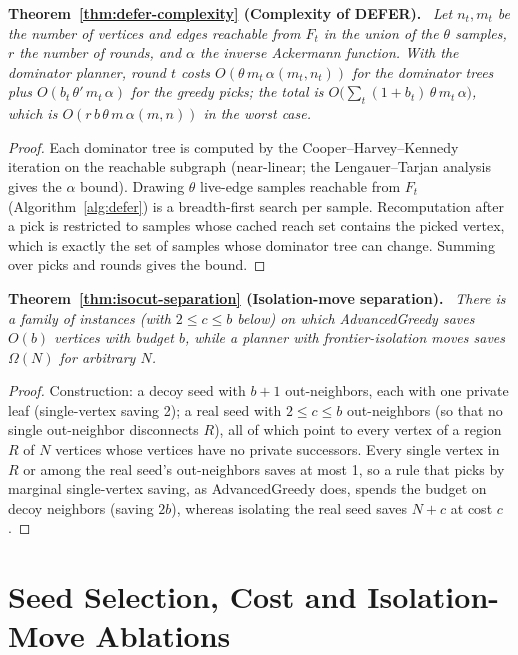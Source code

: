 \documentclass[preprint,11pt]{elsarticle}
\theoremstyle{definition}
\theoremstyle{remark}
\newenvironment{repeattheorem}[1][]{\par\medskip\noindent\textbf{#1.}\ \itshape}{\par\medskip}
\begin{document}
\begin{repeattheorem}[Theorem~\ref{thm:defer-complexity} (Complexity of DEFER)]
Let $n_t,m_t$ be the number of vertices and edges reachable from $F_t$ in
the union of the $\theta$ samples, $r$ the number of rounds, and $\alpha$
the inverse Ackermann function. With the dominator planner, round $t$
costs $O(\theta\,m_t\,\alpha(m_t,n_t))$ for the dominator trees plus
$O(b_t\,\theta'\,m_t\,\alpha)$ for the greedy picks; the total is
$O\bigl(\sum_t(1+b_t)\,\theta\,m_t\,\alpha\bigr)$, which is
$O(r\,b\,\theta\,m\,\alpha(m,n))$ in the worst case.
\end{repeattheorem}
\begin{proof}
Each dominator tree is computed by the Cooper--Harvey--Kennedy iteration
on the reachable subgraph (near-linear; the Lengauer--Tarjan analysis gives
the $\alpha$ bound). Drawing $\theta$ live-edge samples reachable from
$F_t$ (Algorithm~\ref{alg:defer}) is a breadth-first search per sample. Recomputation after a pick is restricted to samples
whose cached reach set contains the picked vertex, which is exactly the
set of samples whose dominator tree can change. Summing over picks and
rounds gives the bound.
\end{proof}

\begin{repeattheorem}[Theorem~\ref{thm:isocut-separation} (Isolation-move separation)]
There is a family of instances (with $2\le c\le b$ below) on which AdvancedGreedy saves $O(b)$ vertices with budget $b$,
while a planner with frontier-isolation moves saves $\Omega(N)$ for
arbitrary $N$.
\end{repeattheorem}
\begin{proof}
Construction: a decoy seed with $b+1$ out-neighbors, each with one private
leaf (single-vertex saving 2); a real seed with $2\le c\le b$ out-neighbors (so that no single out-neighbor disconnects $R$), all
of which point to every vertex of a region $R$ of $N$ vertices whose
vertices have no private successors. Every single vertex in $R$ or among
the real seed's out-neighbors saves at most 1, so a rule that picks by marginal single-vertex saving, as AdvancedGreedy does,
spends the budget on decoy neighbors (saving $2b$), whereas
isolating the real seed saves $N+c$ at cost $c$.
\end{proof}

\section{Seed Selection, Cost and Isolation-Move Ablations}\label{ec:seed-sensitivity}
\end{document}
